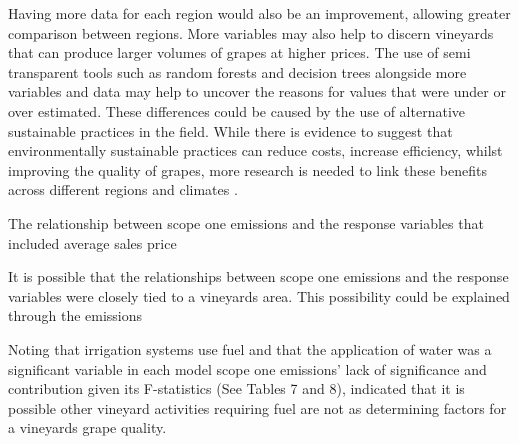\documentclass[review,12pt,authoryear]{elsarticle}
\begin{document}
\begin{linenumbers}
Having more data for each region would also be an improvement, allowing greater comparison between regions. More variables may also help to discern vineyards that can produce larger volumes of grapes at higher prices. The use of semi transparent tools such as random forests and decision trees alongside more variables and data may help to uncover the reasons for values that were under or over estimated. These differences could be caused by the use of alternative sustainable practices in the field. While there is evidence to suggest that environmentally sustainable practices can reduce costs, increase efficiency, whilst improving the quality of grapes, more research is needed to link these benefits across different regions and climates \citep{baianoOverviewSustainabilityWine2021,marianiSustainableWinegrowingCurrent2015,montalvo-falconSustainabilityResearchWine2023}.

The relationship between scope one emissions and the response variables that included average sales price

It is possible that the relationships between scope one emissions and the response variables were closely tied to a vineyards area. This possibility could be explained through the emissions 

Noting that irrigation systems use fuel
and that the application of water was a significant variable in each model
scope one emissions' lack of significance and contribution given its F-statistics (See Tables 7 and 8),
 indicated that it is possible other vineyard activities requiring fuel are not as determining factors for a vineyards grape quality.








\end{linenumbers}
  
\end{document}
